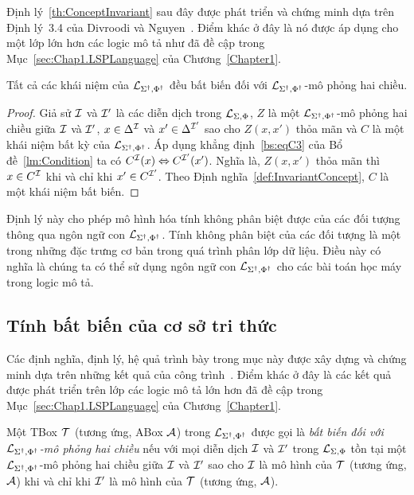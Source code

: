 Định lý~\ref{th:ConceptInvariant} sau đây được phát triển và chứng minh dựa trên Định lý~3.4 của Divroodi và Nguyen~\cite{Divroodi2011B}. Điểm khác ở đây là nó được áp dụng cho một lớp lớn hơn các logic mô tả như đã đề cập trong Mục~\ref{sec:Chap1.LSPLanguage} của Chương~\ref{Chapter1}.

\begin{Theorem}
	\label{th:ConceptInvariant}
	Tất cả các khái niệm của $\mathcal{L}_{\Sigma^\dag,\Phi^\dag}$ đều bất biến đối với $\mathcal{L}_{\Sigma^\dag,\Phi^\dag}$-mô phỏng hai chiều.\myend
\end{Theorem}

\begin{proof}
	Giả sử $\mathcal{I}$ và $\mathcal{I}'$ là các diễn dịch trong $\mathcal{L}_{\Sigma,\Phi}$, $Z$ là một $\mathcal{L}_{\Sigma^\dag,\Phi^\dag}$-mô phỏng hai chiều giữa $\mathcal{I}$ và $\mathcal{I}'$, $x \in \Delta^{\mathcal{I}}$ và $x' \in \Delta^{\mathcal{I}'}$ sao cho $Z(x, x')$ thỏa mãn và $C$ là một khái niệm bất kỳ của $\mathcal{L}_{\Sigma^\dag,\Phi^\dag}$. Áp dụng khẳng định~\eqref{bs:eqC3} của Bổ đề~\ref{lm:Condition} ta có $C^{\mathcal{I}}(x) \Leftrightarrow C^{\mathcal{I}'}(x')$. Nghĩa là, $Z(x,x')$ thỏa mãn thì $x \in C^{\mathcal{I}}$ khi và chỉ khi $x' \in C^{\mathcal{I}'}$. Theo Định nghĩa~\ref{def:InvariantConcept}, $C$ là một khái niệm bất biến.
\end{proof}

Định lý này cho phép mô hình hóa tính không phân biệt được của các đối tượng thông qua ngôn ngữ con $\mathcal{L}_{\Sigma^\dag,\Phi^\dag}$. Tính không phân biệt của các đối tượng là một trong những đặc trưng cơ bản trong quá trình phân lớp dữ liệu. Điều này có nghĩa là chúng ta có thể sử dụng ngôn ngữ con $\mathcal{L}_{\Sigma^\dag,\Phi^\dag}$ cho các bài toán học máy trong logic mô tả.

\subsection{Tính bất biến của cơ sở tri thức}
\label{sec:Chap2.KnowlwdgeBaseInvariant}

Các định nghĩa, định lý, hệ quả trình bày trong mục này được xây dựng và chứng minh dựa trên những kết quả của công trình~\cite{Divroodi2011B}. Điểm khác ở đây là các kết quả được phát triển trên lớp các logic mô tả lớn hơn đã đề cập trong Mục~\ref{sec:Chap1.LSPLanguage} của Chương~\ref{Chapter1}.

\begin{Definition}
\label{def:BoxInvariant}
	Một TBox $\mathcal{T}$ (tương ứng, ABox $\mathcal{A}$) trong $\mathcal{L}_{\Sigma^\dag,\Phi^\dag}$ được gọi là {\em bất biến đối với $\mathcal{L}_{\Sigma^\dag,\Phi^\dag}$-mô phỏng hai chiều} nếu với mọi diễn dịch $\mathcal{I}$ và $\mathcal{I}'$ trong $\mathcal{L}_{\Sigma,\Phi}$ tồn tại một $\mathcal{L}_{\Sigma^\dag,\Phi^\dag}$-mô phỏng hai chiều giữa $\mathcal{I}$ và $\mathcal{I}'$ sao cho $\mathcal{I}$ là mô hình của $\mathcal{T}$ (tương ứng, $\mathcal{A}$) khi và chỉ khi $\mathcal{I}'$ là mô hình của $\mathcal{T}$ (tương ứng, $\mathcal{A}$).\myend
\end{Definition}

